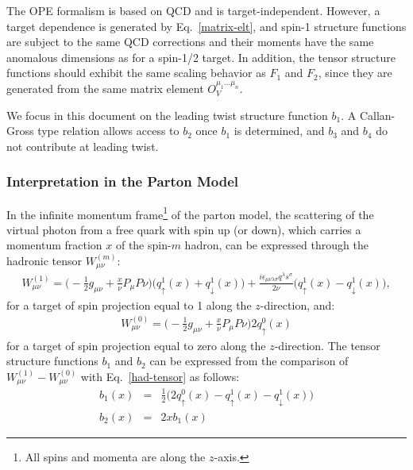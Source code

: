 The OPE formalism is based on QCD and is target-independent. However, a target dependence 
is generated by Eq.~\ref{matrix-elt}, and spin-1 structure functions are subject to 
the same QCD corrections and their moments have the same anomalous dimensions as for 
a spin-1/2 target. In addition, the tensor structure functions should exhibit the same 
scaling behavior as $F_1$ and $F_2$, since they are generated from the same matrix 
element $O_V^{\mu_1...\mu_n}$.

We focus in this document on the leading twist structure function $b_1$.  A Callan-Gross type relation allows access to $b_2$ once $b_1$ is determined, and $b_3$ and $b_4$ do not contribute at leading twist.
\subsubsection{Interpretation in the Parton Model}
%
In the infinite momentum frame\footnote{All spins and
momenta are along the $z$-axis.} of the parton model, 
the scattering of the virtual photon from a free quark 
with spin up (or down), which carries a momentum fraction $x$ of the spin-$m$ hadron, can be 
expressed through the hadronic tensor $W_{\mu\nu}^{(m)}$:
%
\begin{eqnarray}
W_{\mu\nu}^{(1)} = \Bigg(- \frac{1}{2} g_{\mu\nu} + \frac{x}{\nu} P_{\mu}P{\nu}\Bigg) 
                               \Big(q^1_{\uparrow}(x) + q^1_{\downarrow}(x)\Big) \nonumber
                    + \frac{i \epsilon_{\mu\nu\lambda\sigma} q^{\lambda} s^{\sigma}}{2 \nu} 
                               \Big(q^1_{\uparrow}(x) - q^1_{\downarrow}(x)\Big),
\label{had-tensor-1}
\end{eqnarray}
%
for a target of spin projection equal to 1 along the $z$-direction, and:
%
\begin{eqnarray}
W_{\mu\nu}^{(0)} = \Bigg(- \frac{1}{2} g_{\mu\nu} + \frac{x}{\nu} P_{\mu}P{\nu}\Bigg) 
                               2 q^0_{\uparrow}(x) 
\label{had-tensor-0}
\end{eqnarray}
%
for a target of spin projection equal to zero along the $z$-direction. The tensor 
structure functions $b_1$ and $b_2$ can be expressed from the comparison of 
$W_{\mu\nu}^{(1)} - W_{\mu\nu}^{(0)}$ with Eq.~\ref{had-tensor} as follows:
%
\begin{eqnarray}
b_1(x) &=& \frac{1}{2} \Big( 2 q^0_{\uparrow}(x) - q^1_{\uparrow}(x) - q^1_{\downarrow}(x) \Big) \\
b_2(x) &=& 2 x b_1(x)
\label{TSF-parton}
\end{eqnarray}
